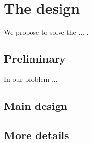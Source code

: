 \section{The design}
\label{design}

We propose to solve the ... .

\subsection{Preliminary}
In our problem ...

\subsection{Main design}

\subsection{More details}

